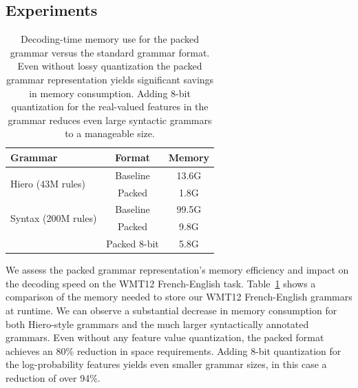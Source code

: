 \documentclass[11pt]{article}
\begin{document}
\subsection{Experiments}

\begin{table}[!t]
\centering
\begin{tabular}{|l|c|c|}
  \hline
  Grammar & Format & Memory \\
  \hline\hline
  \multirow{2}{*}{Hiero (43M rules)} & Baseline & 13.6G \\
  & Packed & 1.8G \\
  \hline
  \hline
  \multirow{2}{*}{Syntax (200M rules)} & Baseline & 99.5G \\
  &  Packed & 9.8G \\
  &  Packed 8-bit & 5.8G \\
  \hline
\end{tabular}
\caption{Decoding-time memory use for the packed grammar
  versus the standard grammar format. Even without lossy quantization the
  packed grammar representation yields significant savings in memory
  consumption. Adding 8-bit quantization for the real-valued features
  in the grammar reduces even large syntactic grammars to a manageable
  size.}
\label{tab-memory}
\end{table}

We assess the packed grammar representation's memory efficiency and
impact on the decoding speed on the WMT12 French-English
task. Table~\ref{tab-memory} shows a comparison of the memory needed
to store our WMT12 French-English grammars at runtime. We can observe
a substantial decrease in memory consumption for both Hiero-style
grammars and the much larger syntactically annotated grammars. Even
without any feature value quantization, the packed format achieves an
80\% reduction in space requirements. Adding 8-bit quantization for
the log-probability features yields even smaller grammar sizes, in
this case a reduction of over 94\%.
\end{document}
